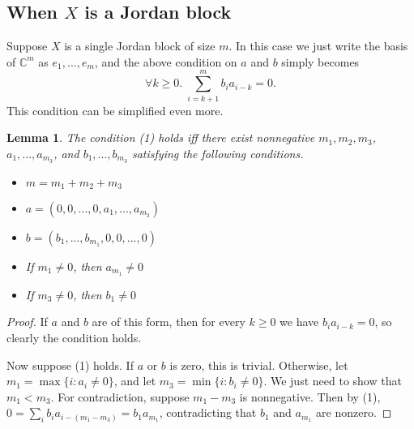 \documentclass[12pt,psamsfonts]{article}
\newtheorem{lemma}[theorem]{Lemma}
\begin{document}
\subsection{When \(X\) is a Jordan block}
Suppose \(X\) is a single Jordan block of size \(m\).
In this case we just write the basis of \(\mathbb{C}^m\) as \(e_1, ..., e_m\), and the above condition on \(a\) and \(b\) simply becomes
\begin{equation}
    \forall k \geq 0. \; \sum_{i = k + 1}^m b_i a_{i - k} = 0.
\end{equation}
This condition can be simplified even more.
\begin{lemma}
    The condition (1) holds iff there exist nonnegative \(m_1, m_2, m_3\), \(a_1, ..., a_{m_3}\), and \(b_1, ..., b_{m_3}\) satisfying the following conditions.
    \begin{itemize}
        \item \(m = m_1 + m_2 + m_3\)
        \item \(a = (0, 0, ..., 0, a_1, ..., a_{m_3})\)
        \item \(b = (b_1, ..., b_{m_1}, 0, 0, ..., 0)\)
        \item If \(m_1 \neq 0\), then \(a_{m_1} \neq 0\)
        \item If \(m_3 \neq 0\), then \(b_1 \neq 0\)
    \end{itemize}
\end{lemma}
\begin{proof}
    If \(a\) and \(b\) are of this form, then for every \(k \geq 0\) we have \(b_i a_{i - k} = 0\), so clearly the condition holds.
    \par Now suppose (1) holds.
    If \(a\) or \(b\) is zero, this is trivial.
    Otherwise, let \(m_1 = \max\{i : a_i \neq 0\}\), and let \(m_3 = \min\{i : b_i \neq 0\}\).
    We just need to show that \(m_1 < m_3\).
    For contradiction, suppose \(m_1 - m_3\) is nonnegative.
    Then by (1), \(0 = \sum_i b_i a_{i - (m_1 - m_3)} = b_1 a_{m_1}\), contradicting that \(b_1\) and \(a_{m_1}\) are nonzero.
\end{proof}
\end{document}
